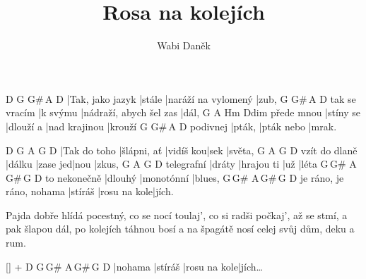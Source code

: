 \documentclass{song}
\title{Rosa na kolejích}
\author{Wabi Daněk}
\begin{document}
\strophe
D                G\6    G\#\6\,A\6          D
|Tak, jako jazyk |stále |naráží na vylomený |zub,
              G\6      G\#\6\,A\6              D
tak se vracím |k svýmu |nádraží, abych šel zas |dál,
           G\6       A\6       Hm            Ddim
přede mnou |stíny se |dlouží a |nad krajinou |krouží
         G\6    G\#\6\,A\6 D
podivnej |pták, |pták nebo |mrak.
\endstrophe

D            G\6         A\6       G\6  D
|Tak do toho |šlápni, ať |vidíš kou|sek |světa,
              G\6    A\6      G\6  D
vzít do dlaně |dálku |zase jed|nou |zkus,
           G\6    A\6        G\6 D
telegrafní |dráty |hrajou ti |už |léta
           G\6\,G\#\6 A\6\,G\#\6\,G\6 D
to nekonečně |dlouhý |monotónní |blues,
                         G\6\,G\#\6 A\6\,G\#\6\,G\6 D
je ráno, je ráno, nohama |stíráš |rosu na kole|jích.
\endstrophe

\strophe*
Pajda dobře hlídá pocestný, co se nocí toulaj', 
co si radši počkaj', až se stmí, a pak šlapou dál, 
po kolejích táhnou bosí a na špagátě nosí 
celej svůj dům, deku a rum.
\endstrophe

\ref{} + \strophe
D       G\6\,G\#\6 A\6\,G\#\6\,G\6 D
|nohama |stíráš |rosu na kole|jích\ldots
\endstrophe
\end{document}
